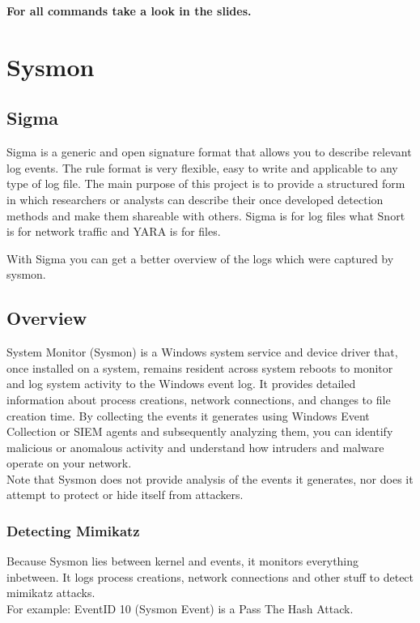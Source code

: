 \textbf{For all commands take a look in the slides.}







\section{Sysmon}
\subsection{Sigma}
Sigma is a generic and open signature format that allows you to describe relevant log events. The rule format is very flexible, easy to write and applicable to any type of log file. The main purpose of this project is to provide a structured form in which researchers or analysts can describe their once developed detection methods and make them shareable with others. Sigma is for log files what Snort is for network traffic and YARA is for files.

With Sigma you can get a better overview of the logs which were captured by sysmon.

\subsection{Overview}
System Monitor (Sysmon) is a Windows system service and device driver that, once installed on a system, remains resident across system reboots to monitor and log system activity to the Windows event log. It provides detailed information about process creations, network connections, and changes to file creation time. By collecting the events it generates using Windows Event Collection or SIEM agents and subsequently analyzing them, you can identify malicious or anomalous activity and understand how intruders and malware operate on your network.\\

Note that Sysmon does not provide analysis of the events it generates, nor does it attempt to protect or hide itself from attackers.

\subsubsection{Detecting Mimikatz}
Because Sysmon lies between kernel and events, it monitors everything inbetween. It logs process creations, network connections and other stuff to detect mimikatz attacks.\\

For example: EventID 10 (Sysmon Event) is a Pass The Hash Attack.